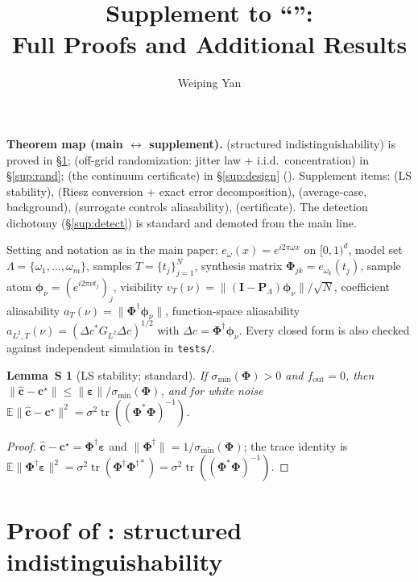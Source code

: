 \documentclass[10pt]{article}
\title{Supplement to ``\SharedTitle'':\\ Full Proofs and Additional Results}
\author{Weiping Yan}
\date{}
\newtheorem{lemma}{Lemma~S}
\DeclareMathOperator{\tr}{tr}
\newcommand{\Lam}{\Lambda}
\newcommand{\Phimat}{\bm{\Phi}}
\newcommand{\norm}[1]{\lVert#1\rVert}
\newcommand{\vt}{v_T}
\newcommand{\at}{a_T}
\begin{document}
\maketitle

\noindent\textbf{Theorem map (main $\leftrightarrow$ supplement).}
\MThmGrid{} (structured indistinguishability) is proved in \S\ref{sup:grid};
\MThmJitter{} (off-grid randomization: jitter law + i.i.d.\ concentration) in
\S\ref{sup:rand}; \MPropCert{} (the continuum certificate) in \S\ref{sup:design}
(\SPropCertS).  Supplement items: \SLemLS{} (LS stability), \SPropDecomp{} (Riesz
conversion + exact error decomposition), \SPropAvg{} (average-case, background),
\SPropSurr{} (surrogate controls aliasability), \SPropCertS{} (certificate).  The
detection dichotomy (\S\ref{sup:detect}) is standard and demoted from the main line.

\medskip\noindent Setting and notation as in the main paper: $e_\omega(x)=e^{i2\pi\omega x}$
on $[0,1)^d$, model set $\Lam=\{\omega_1,\dots,\omega_m\}$, samples $T=\{t_j\}_{j=1}^N$,
synthesis matrix $\Phimat_{jk}=e_{\omega_k}(t_j)$, sample atom
$\bm\phi_\nu=(e^{i2\pi\nu t_j})_j$, visibility
$\vt(\nu)=\norm{(\bm I-\bm P_\Lam)\bm\phi_\nu}/\sqrt N$, coefficient aliasability
$\at(\nu)=\norm{\Phimat^\dagger\bm\phi_\nu}$, function-space aliasability
$a_{L^2,T}(\nu)=(\Delta c^{*}G_{L^2}\Delta c)^{1/2}$ with $\Delta c=\Phimat^\dagger\bm\phi_\nu$.
Every closed form is also checked against independent simulation in \texttt{tests/}.

\begin{lemma}[LS stability; standard]\label{lem:ls}
If $\sigma_{\min}(\Phimat)>0$ and $f_{\mathrm{out}}=0$, then
$\norm{\hat{\bm c}-\bm c^\star}\le\norm{\bm\varepsilon}/\sigma_{\min}(\Phimat)$, and for
white noise $\mathbb E\norm{\hat{\bm c}-\bm c^\star}^2=\sigma^2\tr((\Phimat^{*}\Phimat)^{-1})$.
\end{lemma}
\begin{proof}
$\hat{\bm c}-\bm c^\star=\Phimat^\dagger\bm\varepsilon$ and
$\norm{\Phimat^\dagger}=1/\sigma_{\min}(\Phimat)$; the trace identity is
$\mathbb E\norm{\Phimat^\dagger\bm\varepsilon}^2=\sigma^2\tr(\Phimat^\dagger\Phimat^{\dagger*})
=\sigma^2\tr((\Phimat^{*}\Phimat)^{-1})$.
\end{proof}

\section{Proof of \MThmGrid: structured indistinguishability}\label{sup:grid}\label{thm:t1}
\end{document}
